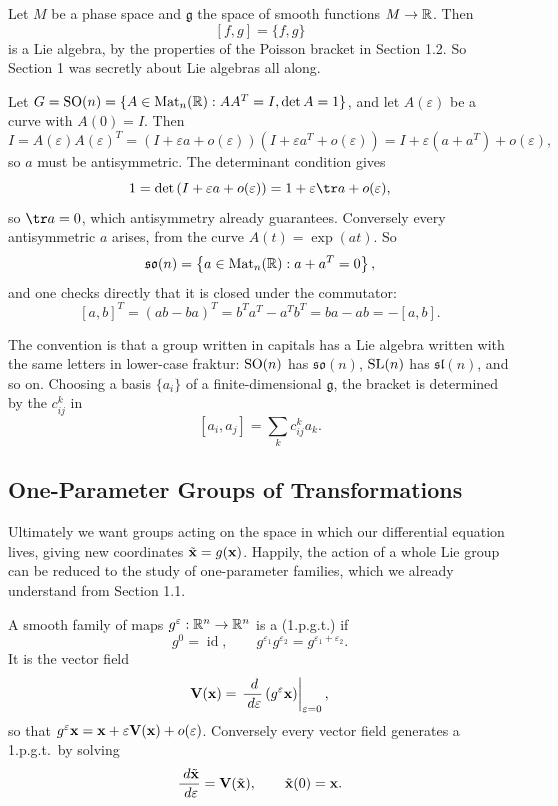 \documentclass[a4paper]{scrartcl}
\newcommand{\Mat}{\operatorname{Mat}}
\newcommand{\lie}[1]{\mathfrak{#1}}
\newcommand{\id}{\operatorname{id}}
\begin{document}
\begin{example}
	Let $M$ be a phase space and $\lie g$ the space of smooth functions $M\to\mathbb{R}$. Then
	$$
	[f,g] = \{f,g\}
	$$
	is a Lie algebra, by the properties of the Poisson bracket in Section 1.2. So Section 1 was secretly about Lie algebras all along.
\end{example}

\begin{example}
	Let $G = \SO(n) = \{A\in\Mat_n(\R) : AA^T = I, \det A = 1\}$, and let $A(\varepsilon)$ be a curve with $A(0)=I$. Then
	$$
	I = A(\varepsilon)A(\varepsilon)^T = \left(I + \varepsilon a + o(\varepsilon)\right)\left(I + \varepsilon a^T+o(\varepsilon)\right) = I + \varepsilon(a+a^T) + o(\varepsilon),
	$$
	so $a$ must be antisymmetric. The determinant condition gives
	$$
	1 = \det\left(I + \varepsilon a + o(\varepsilon)\right) = 1 + \varepsilon\tr a + o(\varepsilon),
	$$
	so $\tr a = 0$, which antisymmetry already guarantees. Conversely every antisymmetric $a$ arises, from the curve $A(t) = \exp(at)$. So
	$$
	\lie{so}(n) = \left\{a\in\Mat_n(\R) : a + a^T = 0\right\},
	$$
	and one checks directly that it is closed under the commutator:
	$$
	[a,b]^T = (ab-ba)^T = b^Ta^T - a^Tb^T = ba - ab = -[a,b].
	$$
\end{example}

The convention is that a group written in capitals has a Lie algebra written with the same letters in lower-case fraktur: $\operatorname{SO}(n)$ has $\lie{so}(n)$, $\operatorname{SL}(n)$ has $\lie{sl}(n)$, and so on. Choosing a basis $\{a_i\}$ of a finite-dimensional $\lie g$, the bracket is determined by the  $c_{ij}^k$ in
$$
[a_i,a_j] = \sum_kc_{ij}^ka_k.
$$

\subsection{One-Parameter Groups of Transformations}

Ultimately we want groups acting on the space in which our differential equation lives, giving new coordinates $\tilde{\mathbf{x}} = g(\mathbf{x})$. Happily, the action of a whole Lie group can be reduced to the study of one-parameter families, which we already understand from Section 1.1.

\begin{definition}
	A smooth family of maps $g^\varepsilon : \mathbb{R}^n\to\mathbb{R}^n$ is a  (1.p.g.t.) if
	$$
	g^0 = \id, \qquad g^{\varepsilon_1}g^{\varepsilon_2} = g^{\varepsilon_1+\varepsilon_2}.
	$$
	It is  the vector field
	$$
	\mathbf{V}(\mathbf{x}) = \left.\frac{\; d}{\; d\varepsilon}\left(g^\varepsilon\mathbf{x}\right)\right|_{\varepsilon=0},
	$$
	so that $g^\varepsilon\mathbf{x} = \mathbf{x} + \varepsilon\mathbf{V}(\mathbf{x}) + o(\varepsilon)$. Conversely every vector field generates a 1.p.g.t.\ by solving
	$$
	\frac{\; d\tilde{\mathbf{x}}}{\; d\varepsilon} = \mathbf{V}(\tilde{\mathbf{x}}), \qquad \tilde{\mathbf{x}}(0) = \mathbf{x}.
	$$
\end{definition}
\end{document}
